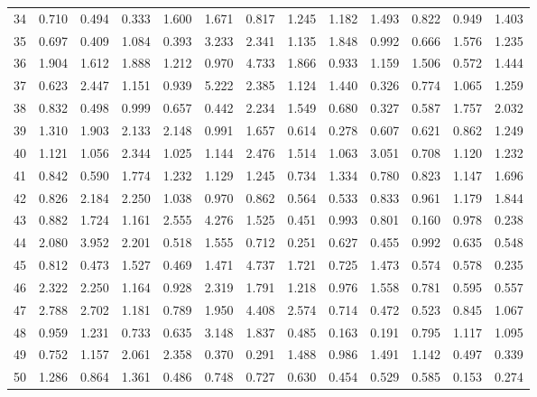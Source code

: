 \begin{tabular}{lrrrrrrrrrrrr}
34  &  0.710 &  0.494 &  0.333 &  1.600 &  1.671 &  0.817 &  1.245 &  1.182 &  1.493 &  0.822 &  0.949 &  1.403 \\
35  &  0.697 &  0.409 &  1.084 &  0.393 &  3.233 &  2.341 &  1.135 &  1.848 &  0.992 &  0.666 &  1.576 &  1.235 \\
36  &  1.904 &  1.612 &  1.888 &  1.212 &  0.970 &  4.733 &  1.866 &  0.933 &  1.159 &  1.506 &  0.572 &  1.444 \\
37  &  0.623 &  2.447 &  1.151 &  0.939 &  5.222 &  2.385 &  1.124 &  1.440 &  0.326 &  0.774 &  1.065 &  1.259 \\
38  &  0.832 &  0.498 &  0.999 &  0.657 &  0.442 &  2.234 &  1.549 &  0.680 &  0.327 &  0.587 &  1.757 &  2.032 \\
39  &  1.310 &  1.903 &  2.133 &  2.148 &  0.991 &  1.657 &  0.614 &  0.278 &  0.607 &  0.621 &  0.862 &  1.249 \\
40  &  1.121 &  1.056 &  2.344 &  1.025 &  1.144 &  2.476 &  1.514 &  1.063 &  3.051 &  0.708 &  1.120 &  1.232 \\
41  &  0.842 &  0.590 &  1.774 &  1.232 &  1.129 &  1.245 &  0.734 &  1.334 &  0.780 &  0.823 &  1.147 &  1.696 \\
42  &  0.826 &  2.184 &  2.250 &  1.038 &  0.970 &  0.862 &  0.564 &  0.533 &  0.833 &  0.961 &  1.179 &  1.844 \\
43  &  0.882 &  1.724 &  1.161 &  2.555 &  4.276 &  1.525 &  0.451 &  0.993 &  0.801 &  0.160 &  0.978 &  0.238 \\
44  &  2.080 &  3.952 &  2.201 &  0.518 &  1.555 &  0.712 &  0.251 &  0.627 &  0.455 &  0.992 &  0.635 &  0.548 \\
45  &  0.812 &  0.473 &  1.527 &  0.469 &  1.471 &  4.737 &  1.721 &  0.725 &  1.473 &  0.574 &  0.578 &  0.235 \\
46  &  2.322 &  2.250 &  1.164 &  0.928 &  2.319 &  1.791 &  1.218 &  0.976 &  1.558 &  0.781 &  0.595 &  0.557 \\
47  &  2.788 &  2.702 &  1.181 &  0.789 &  1.950 &  4.408 &  2.574 &  0.714 &  0.472 &  0.523 &  0.845 &  1.067 \\
48  &  0.959 &  1.231 &  0.733 &  0.635 &  3.148 &  1.837 &  0.485 &  0.163 &  0.191 &  0.795 &  1.117 &  1.095 \\
49  &  0.752 &  1.157 &  2.061 &  2.358 &  0.370 &  0.291 &  1.488 &  0.986 &  1.491 &  1.142 &  0.497 &  0.339 \\
50  &  1.286 &  0.864 &  1.361 &  0.486 &  0.748 &  0.727 &  0.630 &  0.454 &  0.529 &  0.585 &  0.153 &  0.274 \\

\end{tabular}

